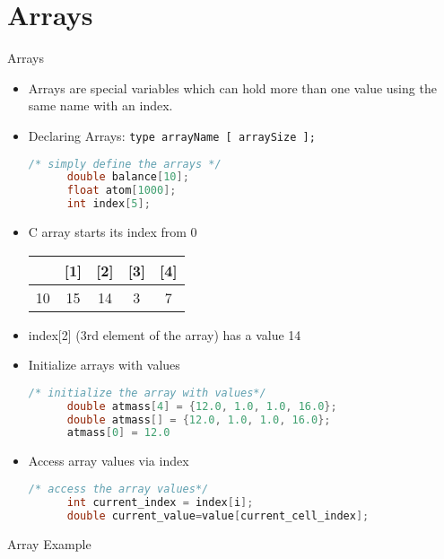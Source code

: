 \documentclass[10pt,t]{beamer}
\begin{document}
\section{Arrays}
\begin{frame}[fragile]{Arrays}
  \begin{itemize}
  \item Arrays are special variables which can hold more than one value using the same name with an index.
  \item Declaring Arrays: \lstinline|type arrayName [ arraySize ];|
    \begin{lstlisting}[language=C]
      /* simply define the arrays */
      double balance[10];
      float atom[1000];
      int index[5];
    \end{lstlisting}
  \item C array starts its index from 0

    \begin{tabular}{|c|c|c|c|c|}
      \hline
      [0] & [1] & [2] & [3] & [4] \\
      \hline
      10 & 15 & 14 & 3 & 7 \\
      \hline
    \end{tabular}
  \item[] index[2] (3rd element of the array) has a value 14
  \item Initialize arrays with values
    \begin{lstlisting}[language=C]
      /* initialize the array with values*/
      double atmass[4] = {12.0, 1.0, 1.0, 16.0};
      double atmass[] = {12.0, 1.0, 1.0, 16.0};
      atmass[0] = 12.0
    \end{lstlisting}
  \item Access array values via index
    \begin{lstlisting}[language=C]
      /* access the array values*/
      int current_index = index[i];
      double current_value=value[current_cell_index];
    \end{lstlisting}
  \end{itemize}
\end{frame}

\begin{frame}[fragile]{Array Example}
  
\end{frame}
\end{document}
